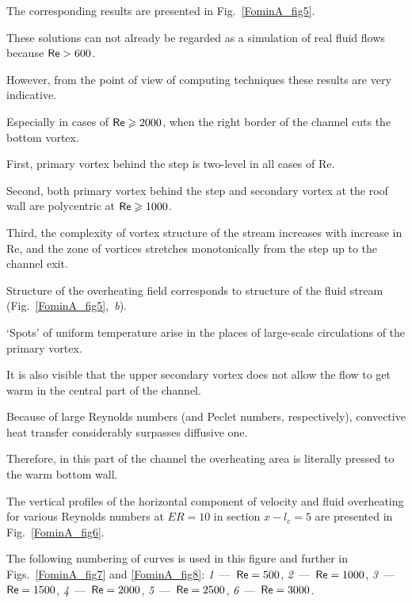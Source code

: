 The corresponding results are presented in Fig.~\ref{FominA_fig5}. 

These solutions can not already be regarded as a simulation of real fluid flows because ${\sf Re} > 600$. 

However, from the point of view of computing techniques these results are very indicative. 

Especially in cases of ${\sf Re} \geqslant 2000$,  when the right border of the channel cuts the bottom vortex. 

First, primary vortex behind the step is two-level in all cases of {\sf Re}. 

Second, both primary vortex behind the step and secondary vortex at the roof wall are polycentric at ${\sf Re} \geqslant 1000$. 

Third, the complexity of vortex structure of the stream increases with increase in {\sf Re}, and the zone of vortices stretches monotonically from the step up to the channel exit.







Structure of the overheating field corresponds to structure of the fluid stream (Fig.~\ref{FominA_fig5},~{\textsl b}\/). 

`Spots' of uniform temperature arise  in the places of large-scale cir\-cu\-la\-tions of the primary vortex. 

It is also visible that the upper secondary vortex does not allow the flow to get warm in the central part of the channel. 

Because of large Reynolds numbers (and Peclet numbers, respectively), convective heat transfer considerably surpasses diffusive one.  

Therefore, in this part of the channel the overheating area is literally pressed to the warm bottom wall.



The vertical profiles of the horizontal component of velocity and fluid over\-heating for various Reynolds numbers at $ER=10$ in section $x-l_c=5$ are presented in Fig.~\ref{FominA_fig6}. 

The following numbering of curves is used in this figure and further in Figs.~\ref{FominA_fig7} and \ref{FominA_fig8}:  {\sl 1}~---~${\sf Re}=500$, {\sl 2}~---~${\sf Re}=1000$, {\sl 3}~---~${\sf Re}=1500$, \mbox{{\sl 4}~---~${\sf Re}=2000$}, {\sl 5}~---~${\sf Re}=2500$, {\sl 6}~---~${\sf Re}=3000$.



